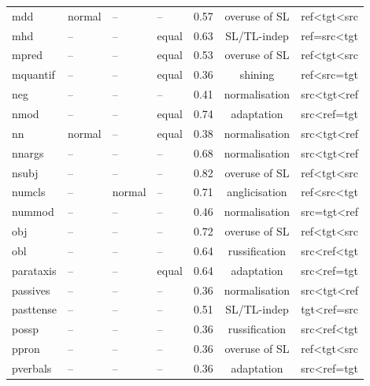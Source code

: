\begin{longtable}{l|p{2cm}p{2cm}p{1.5cm}ccc}
	mdd           & normal       & -- & --       & 0.57    & overuse of SL  & ref\textless{}tgt\textless{}src \\
	mhd           & -- & -- & equal    & 0.63    & SL/TL-indep    & ref=src\textless{}tgt           \\
	mpred         & -- & -- & equal    & 0.53    & overuse of SL  & ref\textless{}tgt\textless{}src \\
	mquantif      & -- & -- & equal    & 0.36    & shining        & ref\textless{}src=tgt           \\
	neg           & -- & -- & --       & 0.41    & normalisation  & src\textless{}tgt\textless{}ref \\
	nmod          & -- & -- & equal    & 0.74    & adaptation     & src\textless{}ref=tgt        \\
	nn            & normal       & -- & equal    & 0.38    & normalisation  & src\textless{}tgt\textless{}ref \\
	nnargs        & -- & -- & --       & 0.68    & normalisation  & src\textless{}tgt\textless{}ref \\
	nsubj         & -- & -- & --       & 0.82    & overuse of SL  & ref\textless{}tgt\textless{}src \\
	numcls        & -- & normal       & --       & 0.71    & anglicisation  & ref\textless{}src\textless{}tgt \\
	nummod        & -- & -- & --       & 0.46    & normalisation        & src=tgt\textless{}ref           \\
	obj           & -- & -- & --       & 0.72    & overuse of SL  & ref\textless{}tgt\textless{}src \\
	obl           & -- & -- & --       & 0.64    & russification  & src\textless{}ref\textless{}tgt \\
	parataxis     & -- & -- & equal    & 0.64    & adaptation     & src\textless{}ref=tgt        \\
	passives      & -- & -- & --       & 0.36    & normalisation  & src\textless{}tgt\textless{}ref \\
	pasttense     & -- & -- & --       & 0.51    & SL/TL-indep    & tgt\textless{}ref=src           \\
	possp         & -- & -- & --       & 0.36    & russification  & src\textless{}ref\textless{}tgt \\
	ppron         & -- & -- & --       & 0.36    & overuse of SL  & ref\textless{}tgt\textless{}src \\
	pverbals      & -- & -- & --       & 0.36    & adaptation     & src\textless{}ref=tgt        \\

\end{longtable}
